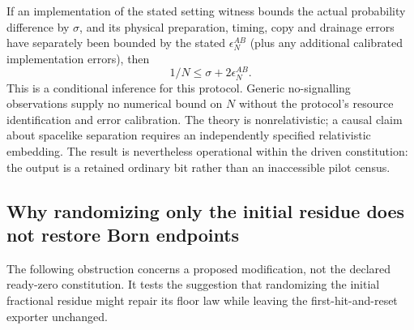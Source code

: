 \documentclass[11pt,a4paper]{article}
\theoremstyle{definition}
\theoremstyle{remark}\newtheorem{remark}[theorem]{Remark}
\begin{document}
If an implementation of the stated setting witness bounds the actual probability difference by $\sigma$, and its physical preparation, timing, copy and drainage errors have separately been bounded by the stated $\epsilon_N^{AB}$ (plus any additional calibrated implementation errors), then
\[
 1/N\le\sigma+2\epsilon_N^{AB}.
\]
This is a conditional inference for this protocol. Generic no-signalling observations supply no numerical bound on $N$ without the protocol's resource identification and error calibration. The theory is nonrelativistic; a causal claim about spacelike separation requires an independently specified relativistic embedding. The result is nevertheless operational within the driven constitution: the output is a retained ordinary bit rather than an inaccessible pilot census.

\subsection{Why randomizing only the initial residue does not restore Born endpoints}

The following obstruction concerns a proposed modification, not the declared ready-zero constitution. It tests the suggestion that randomizing the initial fractional residue might repair its floor law while leaving the first-hit-and-reset exporter unchanged.
\end{document}
